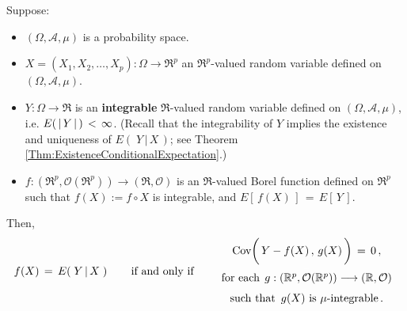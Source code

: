 \begin{theorem}
\label{definingEYXByOrthogonality}
\mbox{}
\vskip 0.2cm
\noindent
Suppose:
\begin{itemize}
\item
	$(\Omega,\mathcal{A},\mu)$ is a probability space.
\item
	$X = (X_{1}, X_{2}, \ldots, X_{p}) : \Omega \longrightarrow \Re^{p}$ an $\Re^{p}$-valued random variable
	defined on $(\Omega,\mathcal{A},\mu)$.
\item
	$Y : \Omega \longrightarrow \Re$ is an \textbf{\color{red}integrable} $\Re$-valued random variable
	defined on $(\Omega,\mathcal{A},\mu)$,
	i.e. $E(\,\vert\,\overset{{\color{white}.}}{Y}\,\vert\,)\,<\,\infty$.
	\vskip 0.01cm
	(Recall that the integrability of $Y$ implies the existence and uniqueness of $E\!\left(\;Y\,\vert\,X\,\right)$;
	see Theorem \ref{Thm:ExistenceConditionalExpectation}.)
\item
	$f : (\Re^{p},\mathcal{O}(\Re^{p})) \longrightarrow (\Re,\mathcal{O})$ is an $\Re$-valued Borel function
	defined on $\Re^{p}$ such that $f(X) := f\circ X$ is integrable, and $E\!\left[\,f(X)\,\right] \,=\, E\!\left[\,Y\,\right]$.
\end{itemize}
Then,
\begin{equation*}
	f(X) \,=\, E\!\left(\;Y\,\vert\,X\;\right)
	\quad\quad\textnormal{if and only if}\quad\quad
	\begin{array}{c}
	\Cov\!\left(\,Y-f(X)\,,\,\overset{{\color{white}\vert}}{g}(X)\,\right) \,=\, 0\,,
	\\
	\overset{{\color{white}-}}{\textnormal{for each}\;\, g : (\Re^{p},\mathcal{O}(\Re^{p}))\longrightarrow (\Re,\mathcal{O})}
	\\
	\overset{{\color{white}-}}{\textnormal{such that \,$g(X)$ is $\mu$-integrable}}\,.
	\end{array}
\end{equation*}
\end{theorem}
